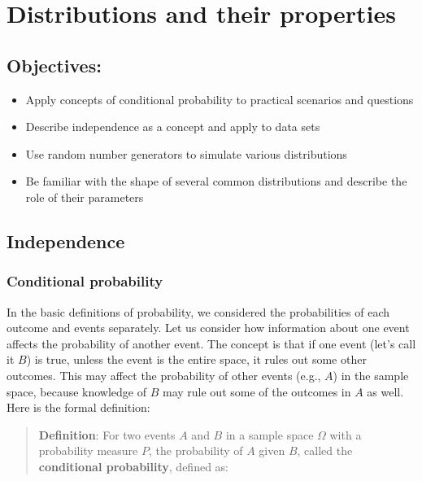 \documentclass[
  letterpaper,
  DIV=11,
  numbers=noendperiod]{scrreprt}
\providecommand{\tightlist}{%
  \setlength{\itemsep}{0pt}\setlength{\parskip}{0pt}}\usepackage{longtable,booktabs,array}
\begin{document}

\hypertarget{distributions-and-their-properties}{%
\chapter{Distributions and their
properties}\label{distributions-and-their-properties}}

\hypertarget{objectives}{%
\section{Objectives:}\label{objectives}}

\begin{itemize}
\tightlist
\item
  Apply concepts of conditional probability to practical scenarios and
  questions
\item
  Describe independence as a concept and apply to data sets
\item
  Use random number generators to simulate various distributions
\item
  Be familiar with the shape of several common distributions and
  describe the role of their parameters
\end{itemize}

\hypertarget{independence}{%
\section{Independence}\label{independence}}

\hypertarget{conditional-probability}{%
\subsection{Conditional probability}\label{conditional-probability}}

In the basic definitions of probability, we considered the probabilities
of each outcome and events separately. Let us consider how information
about one event affects the probability of another event. The concept is
that if one event (let's call it \(B\)) is true, unless the event is the
entire space, it rules out some other outcomes. This may affect the
probability of other events (e.g., \(A\)) in the sample space, because
knowledge of \(B\) may rule out some of the outcomes in \(A\) as well.
Here is the formal definition:

\begin{quote}
\textbf{Definition}: For two events \(A\) and \(B\) in a sample space
\(\Omega\) with a probability measure \(P\), the probability of \(A\)
given \(B\), called the \textbf{conditional probability}, defined as:
\end{quote}
\end{document}
